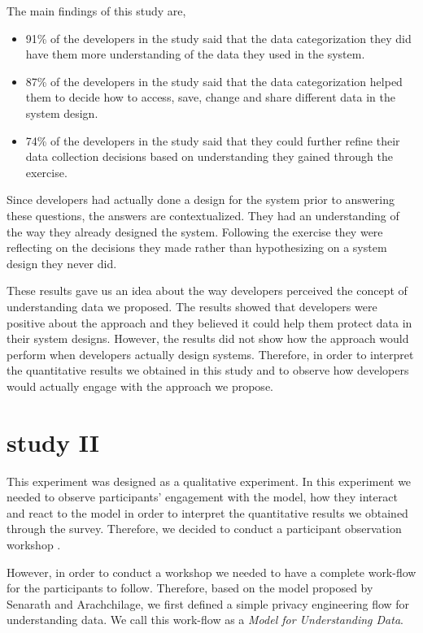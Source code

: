 \documentclass{sigchi}
\begin{document}
The main findings of this study are,

\begin{itemize}
\item 91\% of the developers in the study said that the data categorization they did have them more understanding of the data they used in the system. 
\item 87\% of the developers in the study said that the data categorization helped them to decide how to access, save, change and share different data in the system design.
\item 74\% of the developers in the study said that they could further refine their data collection decisions based on understanding they gained through the exercise.
\end {itemize}

Since developers had actually done a design for the system prior to answering these questions, the answers are contextualized. They had an understanding of the way they already designed the system. Following the exercise they were reflecting on the decisions they made rather than hypothesizing on a system design they never did. 

These results gave us an idea about the way developers perceived the concept of understanding data we proposed. The results showed that developers were positive about the approach and they believed it could help them protect data in their system designs. However, the results did not show how the approach would perform when developers actually design systems. Therefore, in order to interpret the quantitative results we obtained in this study and to observe how developers would actually engage with the approach we propose.

\section{study II}

This experiment was designed as a qualitative experiment. In this experiment we needed to observe participants' engagement with the model, how they interact and react to the model in order to interpret the quantitative results we obtained through the survey. Therefore, we decided to conduct a participant observation workshop \cite {venable2016feds, gregor2013positioning}. 

However, in order to conduct a workshop we needed to have a complete work-flow for the participants to follow. Therefore, based on the model proposed by Senarath and Arachchilage, we first defined a simple privacy engineering flow for understanding data. We call this work-flow as a \textit{Model for Understanding Data}.
\end{document}
